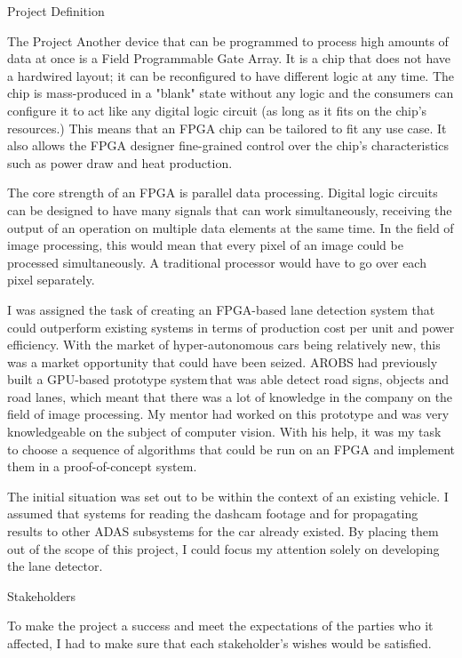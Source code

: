 \documentclass{matthijs}
\begin{document}
\begin{hoofdstuk}{Project Definition}
\begin{paragraaf}{The Project}
			Another device that can be programmed to process high amounts of data at once is a Field Programmable Gate Array.
			It is a chip that does not have a hardwired layout; it can be reconfigured to have different logic at any time.
			The chip is mass-produced in a "blank" state without any logic and the consumers can configure it to act like any digital logic circuit (as long as it fits on the chip's resources.)
			This means that an FPGA chip can be tailored to fit any use case.
			It also allows the FPGA designer fine-grained control over the chip's characteristics such as power draw and heat production.

			The core strength of an FPGA is parallel data processing.
			Digital logic circuits can be designed to have many signals that can work simultaneously, receiving the output of an operation on multiple data elements at the same time.
			In the field of image processing, this would mean that every pixel of an image could be processed simultaneously.
			A traditional processor would have to go over each pixel separately.

			I was assigned the task of creating an FPGA-based lane detection system that could outperform existing systems in terms of production cost per unit and power efficiency.
			With the market of hyper-autonomous cars being relatively new, this was a market opportunity that could have been seized.
			AROBS had previously built a GPU-based prototype system\,that was able detect road signs, objects and road lanes, which meant that there was a lot of knowledge in the company on the field of image processing.
			My mentor had worked on this prototype and was very knowledgeable on the subject of computer vision.
			With his help, it was my task to choose a sequence of algorithms that could be run on an FPGA and implement them in a proof-of-concept system.

			The initial situation was set out to be within the context of an existing vehicle.
			I assumed that systems for reading the dashcam footage and for propagating results to other ADAS subsystems for the car already existed.
			By placing them out of the scope of this project, I could focus my attention solely on developing the lane detector.

		\end{paragraaf}

		\begin{paragraaf}{Stakeholders}

			To make the project a success and meet the expectations of the parties who it affected, I had to make sure that each stakeholder's wishes would be satisfied.


\end{paragraaf}
\end{hoofdstuk}
\end{document}

